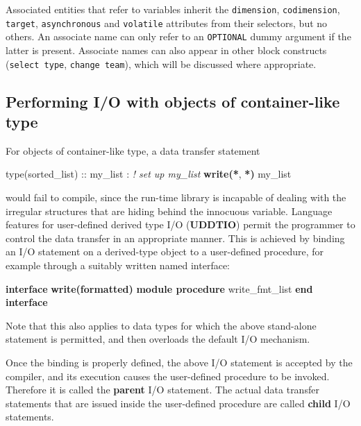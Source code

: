 \documentclass[
  paper=a4,
  ,captions=tableheading
]{scrartcl}
\newenvironment{Shaded}{\begin{snugshade}}{\end{snugshade}}
\newcommand{\CommentTok}[1]{\textcolor[rgb]{0.56,0.35,0.01}{\textit{#1}}}
\newcommand{\DataTypeTok}[1]{\textcolor[rgb]{0.13,0.29,0.53}{#1}}
\newcommand{\FunctionTok}[1]{\textcolor[rgb]{0.13,0.29,0.53}{\textbf{#1}}}
\newcommand{\KeywordTok}[1]{\textcolor[rgb]{0.13,0.29,0.53}{\textbf{#1}}}
\newcommand{\NormalTok}[1]{#1}
\begin{document}
Associated entities that refer to variables inherit the
\texttt{dimension}, \texttt{codimension}, \texttt{target},
\texttt{asynchronous} and \texttt{volatile} attributes from their
selectors, but no others. An associate name can only refer to an
\texttt{OPTIONAL} dummy argument if the latter is present. Associate
names can also appear in other block constructs (\texttt{select\ type},
\texttt{change\ team}), which will be discussed where appropriate.

\subsection{Performing I/O with objects of container-like
type}\label{performing-io-with-objects-of-container-like-type}

For objects of container-like type, a data transfer statement

\begin{Shaded}
\begin{Highlighting}[]
\DataTypeTok{type(sorted\_list)} \DataTypeTok{::}\NormalTok{ my\_list}
\NormalTok{: }\CommentTok{! set up my\_list}
\FunctionTok{write(*}\NormalTok{, }\FunctionTok{*)}\NormalTok{ my\_list}
\end{Highlighting}
\end{Shaded}

would fail to compile, since the run-time library is incapable of
dealing with the irregular structures that are hiding behind the
innocuous variable. Language features for user-defined derived type I/O
(\textbf{UDDTIO}) permit the programmer to control the data transfer in
an appropriate manner. This is achieved by binding an I/O statement on a
derived-type object to a user-defined procedure, for example through a
suitably written named interface:

\begin{Shaded}
\begin{Highlighting}[]

\KeywordTok{interface} \FunctionTok{write(formatted)}
  \KeywordTok{module procedure}\NormalTok{ write\_fmt\_list}
\KeywordTok{end interface}
\end{Highlighting}
\end{Shaded}

Note that this also applies to data types for which the above
stand-alone statement is permitted, and then overloads the default I/O
mechanism.

Once the binding is properly defined, the above I/O statement is
accepted by the compiler, and its execution causes the user-defined
procedure to be invoked. Therefore it is called the \textbf{parent} I/O
statement. The actual data transfer statements that are issued inside
the user-defined procedure are called \textbf{child} I/O statements.
\end{document}
